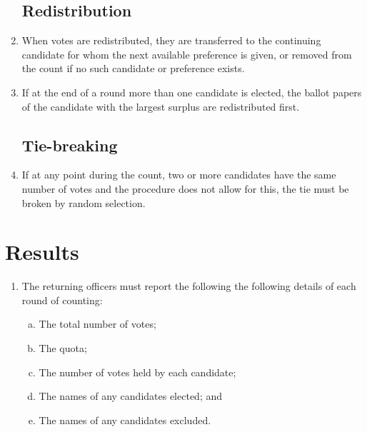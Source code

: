 \documentclass[12pt]{article}
\begin{document}
\begin{enumerate}
    \subsection{Redistribution}
    \item When votes are redistributed, they are transferred to the continuing candidate for whom the next available preference is given, or removed from the count if no such candidate or preference exists.
    \item If at the end of a round more than one candidate is elected, the ballot papers of the candidate with the largest surplus are redistributed first.
    \subsection{Tie-breaking}
    \item If at any point during the count, two or more candidates have the same number of votes and the procedure does not allow for this, the tie must be broken by random selection.
\end{enumerate}


\section{Results}
\begin{enumerate}
    \item The returning officers must report the following the following details of each round of counting:
    \begin{enumerate}[(a)]
        \item The total number of votes;
        \item The quota;
        \item The number of votes held by each candidate;
        \item The names of any candidates elected; and
        \item The names of any candidates excluded.
    \end{enumerate}
\end{enumerate}
\end{document}
